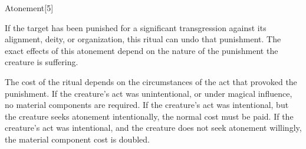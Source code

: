 \begin{spellsection}{Atonement}[5]
    \begin{spellheader}
    \end{spellheader}
    \begin{spellcontent}
        \begin{spelltargetinginfo}
        \end{spelltargetinginfo}
        \begin{spelleffects}

            \spelleffect If the target has been punished for a significant transgression against its alignment, deity, or organization, this ritual can undo that punishment. The exact effects of this atonement depend on the nature of the punishment the creature is suffering.

            The cost of the ritual depends on the circumstances of the act that provoked the punishment. If the creature's act was unintentional, or under magical influence, no material components are required. If the creature's act was intentional, but the creature seeks atonement intentionally, the normal cost must be paid. If the creature's act was intentional, and the creature does not seek atonement willingly, the material component cost is doubled.
        \end{spelleffects}
    \end{spellcontent}
    \begin{spellfooter}
    \end{spellfooter}
\end{spellsection}

